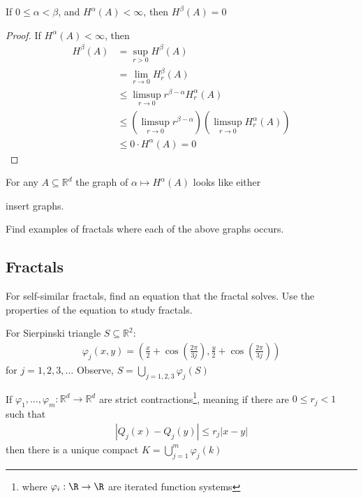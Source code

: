 \begin{lemma}
If $0 \leq \alpha < \beta$, and $H^{\alpha}(A) < \infty$, then $H^{\beta} (A) = 0$
\end{lemma}

\begin{proof}
	If $H^{\alpha}(A) < \infty$, then
	\begin{align*}
		H^{\beta} (A) &= \sup_{r > 0} H^{\beta} (A) \\
					  &= \lim_{r \to 0} H_{r}^{\beta} (A) \\
					  &\leq \limsup_{r \to 0} r^{\beta - \alpha} H_{r}^{\alpha} (A) \\
					  &\leq \left( \limsup_{r \to 0} r^{\beta - \alpha} \right) \left( \limsup_{r \to 0} H_{r}^{\alpha} (A) \right) \\
					  &\leq 0 \cdot H^{\alpha} (A) = 0
	\end{align*}
\end{proof}

For any $A \subseteq \mathbb{R}^d$ the graph of $\alpha \mapsto H^{\alpha} (A)$ looks like either 

insert graphs.

\begin{exercise}
	Find examples of fractals where each of the above graphs occurs.
\end{exercise}

\subsection{Fractals}

For self-similar fractals, find an equation that the fractal solves. Use the properties of the equation to study fractals.

\begin{example}
	For Sierpinski triangle $S \subseteq \mathbb{R}^2$:
	\begin{align*}
		\varphi_{j} (x, y) = \left(\frac{x}{2} + \cos\left(\frac{2 \pi}{3 j}\right), \frac{y}{2} + \cos\left(\frac{2 \pi}{3 j}\right) \right)
	\end{align*} for $j = 1,2,3, \ldots$ Observe,
	$S = \bigcup_{j = 1,2,3} \varphi_j (S) $
\end{example}

\begin{theorem}
	If $\varphi_{1}, \ldots, \varphi_{m} : \mathbb{R}^d \to \mathbb{R}^d$ are strict contractions\footnote{where $\varphi_i : \R \to \R$ are iterated function systems}, meaning if there are $0 \leq r_{j} < 1$ such that
	\begin{align*}
		| Q_j (x) - Q_j (y) | \leq r_{j} |x - y |
	\end{align*} then there is a unique compact
	$K = \bigcup_{j=1}^{m} \varphi_{j} (k)$
\end{theorem}

